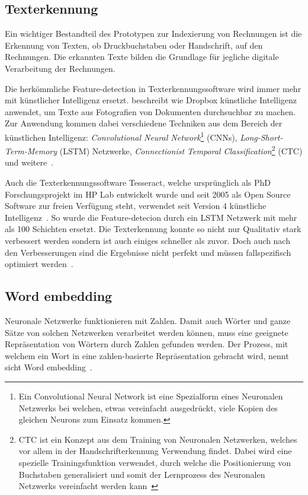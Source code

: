 \subsection{Texterkennung}

Ein wichtiger Bestandteil des Prototypen zur Indexierung von Rechnungen ist die Erkennung von Texten, ob Druckbuchstaben oder Handschrift, auf den Rechnungen. Die erkannten Texte bilden die Grundlage für jegliche digitale Verarbeitung der Rechnungen.

Die herkömmliche Feature-detection in Texterkennungssoftware wird immer mehr mit künstlicher Intelligenz ersetzt. \textcite{Neuberg2017} beschreibt wie Dropbox künstliche Intelligenz anwendet, um Texte aus Fotografien von Dokumenten durchsuchbar zu machen. Zur Anwendung kommen dabei verschiedene Techniken aus dem Bereich der künstlichen Intelligenz: \textit{Convolutional Neural Network}\footnote{Ein Convolutional Neural Network ist eine Spezialform eines Neuronalen Netzwerks bei welchen, etwas vereinfacht ausgedrückt, viele Kopien des gleichen Neurons zum Einsatz kommen\autocite{Olah2014}.} (CNNs),  \textit{Long-Short-Term-Memory} (LSTM) Netzwerke, \textit{Connectionist Temporal Classification}\footnote{CTC ist ein Konzept aus dem Training von Neuronalen Netzwerken, welches vor allem in der Handschrifterkennung Verwendung findet. Dabei wird eine spezielle Trainingsfunktion verwendet, durch welche die Positionierung von Buchstaben generalisiert und somit der Lernprozess des Neuronalen Netzwerks vereinfacht werden kann~\autocite{Scheidl2018}} (CTC) und weitere~\autocite{Neuberg2017}.

Auch die Texterkennungssoftware Tesseract, welche ursprünglich als PhD Forschungsprojekt im HP Lab entwickelt wurde und seit 2005 als Open Source Software zur freien Verfügung steht, verwendet seit Version 4 künstliche Intelligenz~\autocite{Smith2007}. So wurde die Feature-detecion durch ein LSTM Netzwerk mit mehr als 100 Schichten ersetzt. Die Texterkennung konnte so nicht nur Qualitativ stark verbessert werden sondern ist auch einiges schneller als zuvor. Doch auch nach den Verbesserungen sind die Ergebnisse nicht perfekt und müssen fallspezifisch optimiert werden~\autocite{O.V.2018, O.V.2018a}.

\subsection{Word embedding}

Neuronale Netzwerke funktionieren mit Zahlen. Damit auch Wörter und ganze Sätze von solchen Netzwerken verarbeitet werden können, muss eine geeignete Repräsentation von Wörtern durch Zahlen gefunden werden. Der Prozess, mit welchem ein Wort in eine zahlen-basierte Repräsentation gebracht wird, nennt sicht Word embedding~\autocite{Olah2014b}.

